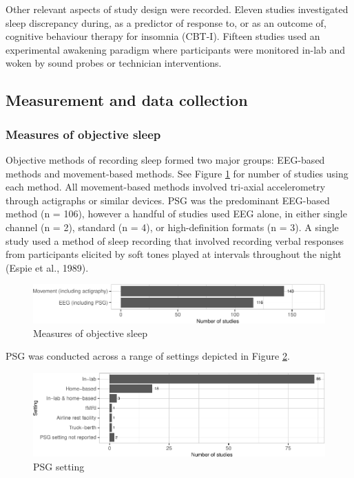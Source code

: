 \documentclass[
]{article}
\begin{document}
Other relevant aspects of study design were recorded. Eleven studies investigated sleep discrepancy during, as a predictor of response to, or as an outcome of, cognitive behaviour therapy for insomnia (CBT-I). Fifteen studies used an experimental awakening paradigm where participants were monitored in-lab and woken by sound probes or technician interventions.

\subsection{Measurement and data collection}\label{measurement-and-data-collection}

\subsubsection{Measures of objective sleep}\label{measures-of-objective-sleep}

Objective methods of recording sleep formed two major groups: EEG-based methods and movement-based methods. See Figure \ref{fig:measures} for number of studies using each method. All movement-based methods involved tri-axial accelerometry through actigraphs or similar devices. PSG was the predominant EEG-based method (n = 106), however a handful of studies used EEG alone, in either single channel (n = 2), standard (n = 4), or high-definition formats (n = 3). A single study used a method of sleep recording that involved recording verbal responses from participants elicited by soft tones played at intervals throughout the night (Espie et al., 1989).

\begin{figure}
\centering
\includegraphics{review_markdown_files/figure-latex/measures-1.pdf}
\caption{\label{fig:measures}Measures of objective sleep}
\end{figure}

PSG was conducted across a range of settings depicted in Figure \ref{fig:setting}.

\begin{figure}
\centering
\includegraphics{review_markdown_files/figure-latex/setting-1.pdf}
\caption{\label{fig:setting}PSG setting}
\end{figure}
\end{document}
